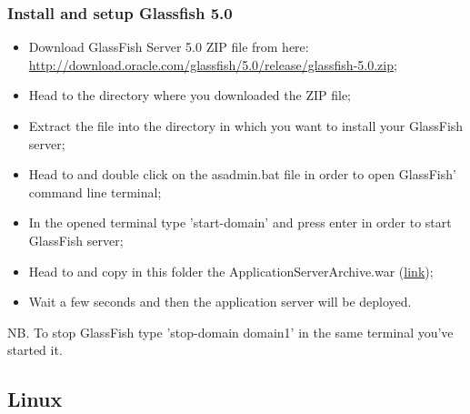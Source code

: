 \subsubsection{Install and setup Glassfish 5.0}
\begin{itemize}
	\item Download GlassFish Server 5.0 ZIP file from here: \\ \href{http://download.oracle.com/glassfish/5.0/release/glassfish-5.0.zip}{\color{blue}http://download.oracle.com/glassfish/5.0/release/glassfish-5.0.zip};
	\item Head to the directory where you downloaded the ZIP file;
	\item Extract the file into the directory in which you want to install your GlassFish server;
	\item Head to  and double click on the asadmin.bat file in order to open GlassFish' command line terminal;
	\item In the opened terminal type 'start-domain' and press enter in order to start GlassFish server;
	\item Head to  and copy in this folder the ApplicationServerArchive.war (\href{https://github.com/JustSalva/MelziPinaSalvadore/tree/master/DeliveryFolder/InstallationFolder}{\color{blue}link});
	\item Wait a few seconds and then the application server will be deployed.
\end{itemize} 
NB. To stop GlassFish type 'stop-domain domain1' in the same terminal you've started it.
	
\subsection{Linux}
\label{subsect:Linux}

